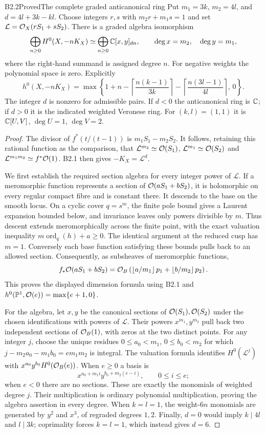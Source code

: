 \begin{claim}{B2.2}{Proved}{The complete graded anticanonical ring}
Put $m_1=3k$, $m_2=4l$, and $d=4l+3k-kl$.
Choose integers $r,s$ with $m_2r+m_1s=1$ and set
$\mathcal L=\mathcal O_X(rS_1+sS_2)$.
There is a graded algebra isomorphism
\[
\bigoplus_{n\ge0}H^0(X,-nK_X)
\simeq\bigoplus_{n\ge0}\mathbb C[x,y]_{dn},
\qquad\deg x=m_2,\quad\deg y=m_1,
\]
where the right-hand summand is assigned degree $n$.
For negative weights the polynomial space is zero. Explicitly
\[
h^0(X,-nK_X)=
\max\left\{1+n-\left\lceil\frac{n(k-1)}{3k}\right\rceil
-\left\lceil\frac{n(3l-1)}{4l}\right\rceil,\,0\right\}.
\]
The integer $d$ is nonzero for admissible pairs. If $d<0$ the
anticanonical ring is $\mathbb C$; if $d>0$ it is the indicated weighted
Veronese ring. For $(k,l)=(1,1)$ it is
$\mathbb C[U,V]$, $\deg U=1$, $\deg V=2$.
\end{claim}
\begin{proof}
The divisor of $f^*(t/(t-1))$ is $m_1S_1-m_2S_2$.
It follows, retaining this rational function as the comparison, that
$\mathcal L^{m_2}\simeq\mathcal O(S_1)$,
$\mathcal L^{m_1}\simeq\mathcal O(S_2)$ and
$\mathcal L^{m_1m_2}\simeq f^*\mathcal O(1)$.
B2.1 then gives $-K_X=\mathcal L^d$.

We first establish the required section algebra for every integer
power of $\mathcal L$. If a meromorphic function represents a section
of $\mathcal O(aS_1+bS_2)$, it is holomorphic on every regular compact fibre
and is constant there. It descends to the base on the smooth locus.
On a cyclic cover $q=s^m$, the finite pole bound gives a Laurent
expansion bounded below, and invariance leaves only powers divisible
by $m$. Thus descent extends meromorphically across the finite point,
with the exact valuation inequality $m\operatorname{ord}_q(h)+a\ge0$.
The identical argument at the reduced cusp has $m=1$.
Conversely each base function satisfying these bounds pulls back to
an allowed section. Consequently, as subsheaves of meromorphic functions,
\[
f_*\mathcal O(aS_1+bS_2)=
\mathcal O_B\left(\left\lfloor a/m_1\right\rfloor p_1+
\left\lfloor b/m_2\right\rfloor p_2\right).
\]
This proves the displayed dimension formula using B2.1 and
$h^0(\mathbb P^1,\mathcal O(e))=\max\{e+1,0\}$.

For the algebra, let $x,y$ be the canonical sections of
$\mathcal O(S_1),\mathcal O(S_2)$ under the chosen identifications with powers of
$\mathcal L$. Their powers $x^{m_1},y^{m_2}$ pull back two independent
sections of $\mathcal O_B(1)$, with zeros at the two distinct points.
For any integer $j$, choose the unique residues
$0\le a_0<m_1$, $0\le b_0<m_2$ for which
$j-m_2a_0-m_1b_0=e m_1m_2$ is integral.
The valuation formula identifies $H^0(\mathcal L^j)$ with
$x^{a_0}y^{b_0}H^0(\mathcal O_B(e))$. When $e\ge0$ a basis is
\[
x^{a_0+m_1i}y^{b_0+m_2(e-i)},\qquad0\le i\le e;
\]
when $e<0$ there are no sections. These are exactly the monomials of
weighted degree $j$. Their multiplication is ordinary polynomial
multiplication, proving the algebra assertion in every degree.
When $k=l=1$, the weight-$6n$ monomials are generated by $y^2$ and
$x^3$, of regraded degrees $1,2$.
Finally, $d=0$ would imply $k\mid4l$ and $l\mid3k$; coprimality
forces $k=l=1$, which instead gives $d=6$.
\end{proof}


